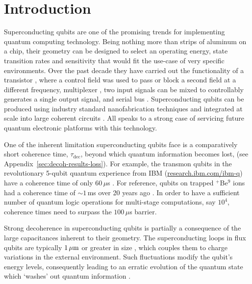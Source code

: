 
\section{Introduction}

\noindent Superconducting  qubits are  one of  the promising  trends for  implementing quantum
computing technology. Being nothing more than strips of aluminum on a chip, their geometry can
be designed to select  an operating energy, state transition rates  and sensitivity that would
fit the use-case  of very specific environments.   Over the past decade they  have carried out
the functionality of a transistor \cite{Astafiev2010, hoi2011}, where a control field was used
to pass or block  a second field at a different  frequency, multiplexer \cite{honigl2018}, two
input signals can  be mixed to controllably  generates a single output signal,  and serial bus
\cite{shen2005}.    Superconducting   qubits  can   be   produced   using  industry   standard
nanofabrication   techniques  and   integrated   at  scale   into   large  coherent   circuits
\cite{johnson2010}.   All speaks  to  a strong  case of  servicing  future quantum  electronic
platforms with this technology.

One of the inherent limitation superconducting  qubits face is a comparatively short coherence
time,   $\tau_{\text{dec}}$,    beyond   which    quantum   information   becomes    lost,   (see
Appendix~\ref{sec:decoh-results-loss}).  For example, the transmon qubits in the revolutionary
5-qubit                quantum                experience               from                IBM
(\href{http://www.research.ibm.com/ibm-q}{research.ibm.com/ibm-q})  have a  coherence time  of
only $ 60\,\mu  $s \cite{linke2017}.  For reference, qubits  on trapped $ ^{+} $Be$  ^{9} $ ions
had a  coherence time of $\sim1\,  $ms over 20 years  ago \cite{monroe1995}.  In order  to have a
sufficient number  of quantum  logic operations  for multi-stage computations,  say $  10^4 $,
coherence times need to surpass the $ 100\,\mu$s barrier.

Strong  decoherence  in  superconducting  qubits  is partially  a  consequence  of  the  large
capacitances  inherent to  their  geometry.   The superconducting  loops  in  flux qubits  are
typically  $  1\,\mu\text{m}$ or  greater  in  size \cite{hoi2011,  johnson2010},  which
couples them to  charge variations in the external environment.   Such fluctuations modify the
qubit's energy levels, consequently leading to an erratic evolution of the quantum state which
`washes' out quantum information \cite{devoret2008}.
 
